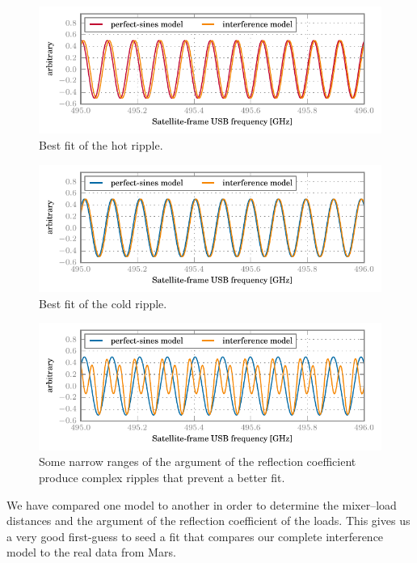 \begin{refsection}
\begin{figure}
    \centering
    \includegraphics{mars_25_interf_distance_fit_hot}
    \caption{Best fit of the hot ripple.}
    \label{fig:mars_25_interf_distance_fit_hot}
\end{figure}
\begin{figure}
    \centering
    \includegraphics{mars_25_interf_distance_fit_cold}
    \caption{Best fit of the cold ripple.}
    \label{fig:mars_25_interf_distance_fit_cold}
\end{figure}
\begin{figure}
    \centering
    \includegraphics{mars_25_interf_distance_fit_cold_poor}
    \caption{Some narrow ranges of the argument of the reflection coefficient produce complex ripples that prevent a better fit.}
    \label{fig:mars_25_interf_distance_fit_cold_poor}
\end{figure}

We have compared one model to another in order to determine the mixer--load distances
and the argument of the reflection coefficient of the loads.
This gives us a very good first-guess to seed a fit that compares our complete interference model to the real data from Mars.






\end{refsection}
